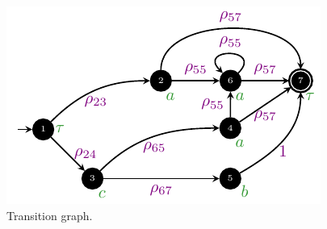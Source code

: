 {{%
%	
\begin{figure}[!t]
	\centering
 \includegraphics[width=.3\textwidth]{images/closed_example.pdf}
\caption{Transition graph.}\label{fig:closedd}
\end{figure}

}}
